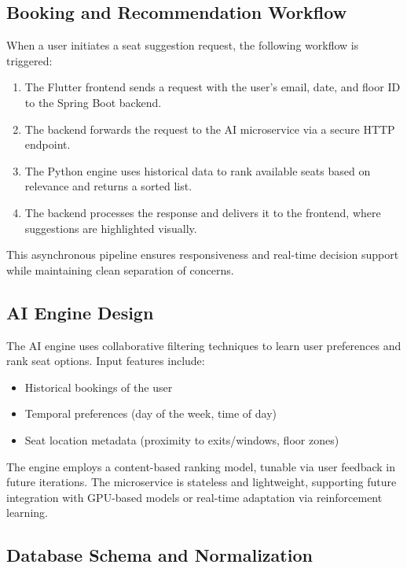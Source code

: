 \documentclass[conference]{IEEEtran}
\begin{document}
\subsection{Booking and Recommendation Workflow}

When a user initiates a seat suggestion request, the following workflow is triggered:

\begin{enumerate}
    \item The Flutter frontend sends a request with the user's email, date, and floor ID to the Spring Boot backend.
    \item The backend forwards the request to the AI microservice via a secure HTTP endpoint.
    \item The Python engine uses historical data to rank available seats based on relevance and returns a sorted list.
    \item The backend processes the response and delivers it to the frontend, where suggestions are highlighted visually.
\end{enumerate}

This asynchronous pipeline ensures responsiveness and real-time decision support while maintaining clean separation of concerns.

\subsection{AI Engine Design}

The AI engine uses collaborative filtering techniques to learn user preferences and rank seat options. Input features include:

\begin{itemize}
    \item Historical bookings of the user
    \item Temporal preferences (day of the week, time of day)
    \item Seat location metadata (proximity to exits/windows, floor zones)
\end{itemize}

The engine employs a content-based ranking model, tunable via user feedback in future iterations. The microservice is stateless and lightweight, supporting future integration with GPU-based models or real-time adaptation via reinforcement learning.

\subsection{Database Schema and Normalization}
\end{document}
